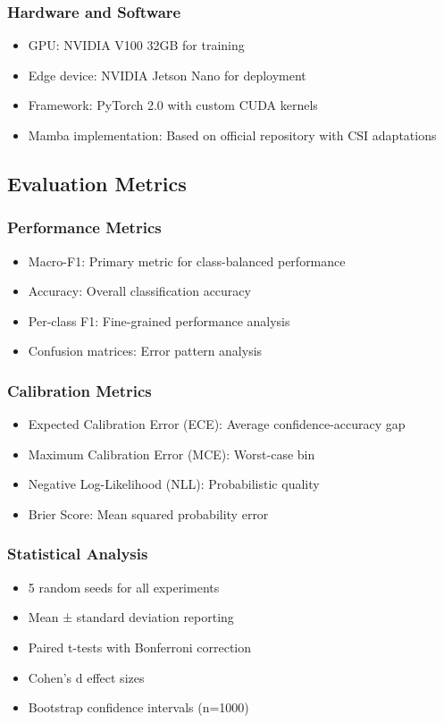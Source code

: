 \documentclass[journal]{IEEEtran}
\begin{document}
\subsubsection{Hardware and Software}
\begin{itemize}
\item GPU: NVIDIA V100 32GB for training
\item Edge device: NVIDIA Jetson Nano for deployment
\item Framework: PyTorch 2.0 with custom CUDA kernels
\item Mamba implementation: Based on official repository with CSI adaptations
\end{itemize}

\subsection{Evaluation Metrics}

\subsubsection{Performance Metrics}
\begin{itemize}
\item Macro-F1: Primary metric for class-balanced performance
\item Accuracy: Overall classification accuracy
\item Per-class F1: Fine-grained performance analysis
\item Confusion matrices: Error pattern analysis
\end{itemize}

\subsubsection{Calibration Metrics}
\begin{itemize}
\item Expected Calibration Error (ECE): Average confidence-accuracy gap
\item Maximum Calibration Error (MCE): Worst-case bin
\item Negative Log-Likelihood (NLL): Probabilistic quality
\item Brier Score: Mean squared probability error
\end{itemize}

\subsubsection{Statistical Analysis}
\begin{itemize}
\item 5 random seeds for all experiments
\item Mean ± standard deviation reporting
\item Paired t-tests with Bonferroni correction
\item Cohen's d effect sizes
\item Bootstrap confidence intervals (n=1000)
\end{itemize}
\end{document}
